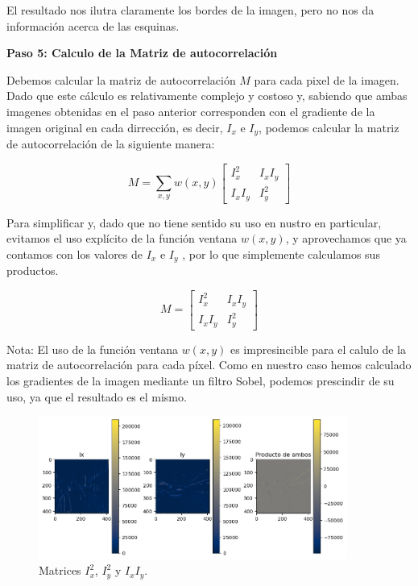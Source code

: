 \documentclass[a4paper]{article}
\begin{document}
El resultado nos ilutra claramente los bordes de la imagen, pero no nos da información acerca de las esquinas.

\par\vspace{0.5cm}
\textbf{Paso 5: Calculo de la Matriz de autocorrelación}
\par\vspace{0.5cm}

Debemos calcular la matriz de autocorrelación \(M\) para cada pixel de la imagen. Dado que este cálculo es relativamente complejo y costoso y, 
sabiendo que ambas imagenes obtenidas en el paso anterior corresponden con el gradiente de la imagen original
en cada dirrección, es decir, \(I_x\) e \(I_y\), podemos calcular la matriz de autocorrelación de la siguiente manera:
\par\vspace{0.3cm}    
\[
    M = \sum_{x, y} w(x, y)
    \begin{bmatrix}
    I_x^2 & I_x I_y \\
    I_x I_y & I_y^2
    \end{bmatrix}
    \]

    \par\vspace{0.3cm}    
Para simplificar y, dado que no tiene sentido su uso en nustro en particular, evitamos el uso explícito de la función ventana \(w(x, y)\), y aprovechamos que
ya contamos con los valores de \(I_x\) e \(I_y\) , por lo que simplemente calculamos sus productos.
\par\vspace{0.3cm}    
\[
    M = 
    \begin{bmatrix}
    I_x^2 & I_x I_y \\
    I_x I_y & I_y^2
    \end{bmatrix}
    \]
    \par\vspace{0.3cm}    
Nota: El uso de la función ventana \(w(x, y)\) es impresincible para el calulo de la matriz de autocorrelación para cada píxel.
Como en nuestro caso hemos calculado los gradientes de la imagen mediante un filtro Sobel, podemos prescindir de su uso, ya que el resultado es el mismo.

\begin{figure}[H]
    \centering
    \includegraphics[width=0.9\textwidth]{images/harris_paso_4.png}
    \caption{Matrices \(I_x^2\), \(I_y^2\) y \(I_xI_y\).}
\end{figure}
\end{document}
